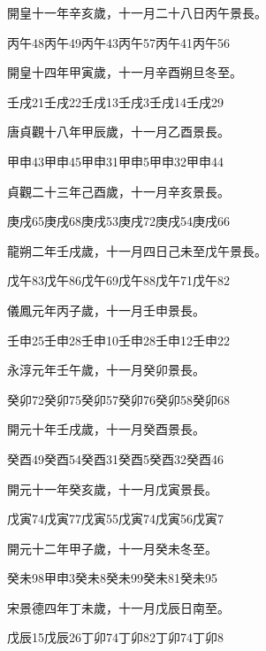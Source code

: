 \begin{pinyinscope}
 開皇十一年辛亥歲，十一月二十八日丙午景長。



 丙午48丙午49丙午43丙午57丙午41丙午56



 開皇十四年甲寅歲，十一月辛酉朔旦冬至。



 壬戌21壬戌22壬戌13壬戌3壬戌14壬戌29



 唐貞觀十八年甲辰歲，十一月乙酉景長。



 甲申43甲申45甲申31甲申5甲申32甲申44



 貞觀二十三年己酉歲，十一月辛亥景長。



 庚戌65庚戌68庚戌53庚戌72庚戌54庚戌66



 龍朔二年壬戌歲，十一月四日己未至戊午景長。



 戊午83戊午86戊午69戊午88戊午71戊午82



 儀鳳元年丙子歲，十一月壬申景長。



 壬申25壬申28壬申10壬申28壬申12壬申22



 永淳元年壬午歲，十一月癸卯景長。



 癸卯72癸卯75癸卯57癸卯76癸卯58癸卯68



 開元十年壬戌歲，十一月癸酉景長。



 癸酉49癸酉54癸酉31癸酉5癸酉32癸酉46



 開元十一年癸亥歲，十一月戊寅景長。



 戊寅74戊寅77戊寅55戊寅74戊寅56戊寅7



 開元十二年甲子歲，十一月癸未冬至。



 癸未98甲申3癸未8癸未99癸未81癸未95



 宋景德四年丁未歲，十一月戊辰日南至。



 戊辰15戊辰26丁卯74丁卯82丁卯74丁卯8




\end{pinyinscope}
